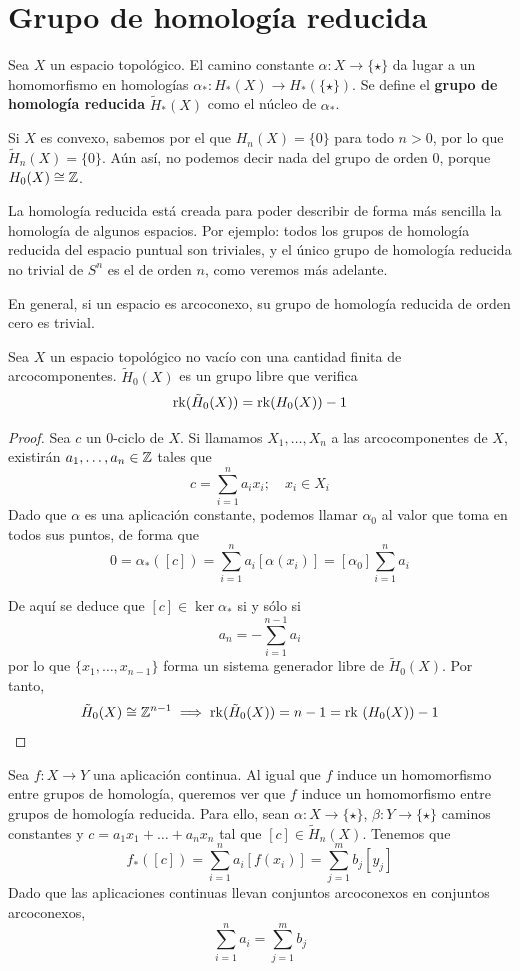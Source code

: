 \section{Grupo de homología reducida}
Sea $X$ un espacio topológico. El camino constante
$\alpha\colon X \to \{\star\}$ da lugar a un homomorfismo en homologías
$\alpha_*\colon H_*(X) \to H_*(\{\star\})$. Se define el \textbf{grupo de
homología reducida} $\tilde H_*(X)$ como el núcleo de $\alpha_*$.

Si $X$ es convexo, sabemos por el  que $H_n(X)=\{0\}$ para
todo $n > 0$, por lo que $\tilde H_n(X)=\{0\}$. Aún así, no podemos decir nada
del grupo de orden 0, porque $H_0(X)\cong \mathbb{Z}$.

La homología reducida está creada para poder describir de forma más sencilla
la homología de algunos espacios. Por ejemplo: todos los grupos de homología
reducida del espacio puntual son triviales, y el único grupo de homología
reducida no trivial de $S^n$ es el de orden $n$, como veremos más adelante.

En general, si un espacio es arcoconexo, su grupo de homología reducida de
orden cero es trivial.

\begin{proposition}
Sea $X$ un espacio topológico no vacío con una cantidad finita de
arcocomponentes. $\tilde{H}_0(X)$ es un grupo libre que verifica
\[\operatorname{rk}(\tilde{H}_0(X))=\operatorname{rk}(H_0(X))-1\]
\end{proposition}

\begin{proof}
Sea $c$ un $0$-ciclo de $X$. Si llamamos $X_1,\dots,X_n$ a las
arcocomponentes de $X$, existirán $a_1,\dots,a_n \in \mathbb{Z}$ tales que
\[c=\sum^n_{i=1}a_ix_i; \quad x_i \in X_i\]
Dado que $\alpha$ es una aplicación constante, podemos llamar $\alpha_0$ al
valor que toma en todos sus puntos, de forma que
\[0=\alpha_*([c])=\sum^n_{i=1}a_i[\alpha(x_i)]=[\alpha_0]\sum^n_{i=1}a_i\]

De aquí se deduce que $[c] \in \ker \alpha_*$ si y sólo si
\[a_n=-\sum^{n-1}_{i=1}a_i\]
por lo que $\{x_1,\dots,x_{n-1}\}$ forma un sistema generador libre de
$\tilde{H}_0(X)$. Por tanto,
\[\tilde{H}_0(X) \cong \mathbb{Z}^{n-1} \implies \operatorname{rk}(\tilde{H}_0(X))=
n-1=\mbox{rk }(H_0(X))-1\]
\end{proof}

Sea $f\colon X \to Y$ una aplicación continua. Al igual que $f$ induce un
homomorfismo entre grupos de homología, queremos ver que $f$ induce un
homomorfismo entre grupos de homología reducida. Para ello, sean $\alpha\colon
X \to \{\star\}$, $\beta\colon Y \to \{\star\}$ caminos constantes y $c=a_1x_1+
\dots+a_nx_n$ tal que $[c] \in \tilde H_n(X)$. Tenemos que
\[f_*([c])=\sum^n_{i=1}a_i[f(x_i)]=\sum^m_{j=1}b_j[y_j]\]
Dado que las aplicaciones continuas llevan conjuntos arcoconexos en conjuntos
arcoconexos,
\[\sum^n_{i=1}a_i=\sum^m_{j=1}b_j\]

